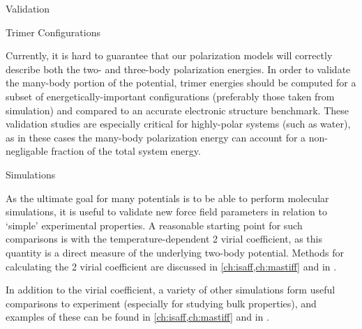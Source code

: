 \begin{subsection}{Validation}

\begin{paragraph}{Trimer Configurations}

Currently, it is hard to guarantee that our polarization models will
correctly describe both the two- and three-body polarization energies. In
order to validate the many-body portion of the potential, trimer
energies should be computed for a subset of energetically-important configurations
(preferably those taken from simulation) and compared to an accurate
electronic structure benchmark. These validation studies are especially
critical for highly-polar systems (such as water), as in these cases the
many-body polarization energy can account for a non-negligable fraction of the
total system energy.

\end{paragraph}

\begin{paragraph}{Simulations}

As the ultimate goal for many potentials is to be able to perform molecular
simulations, it is useful to validate new force field parameters in relation
to `simple' experimental properties. A reasonable starting point for such
comparisons is with the temperature-dependent 2 virial coefficient, as this quantity is a
direct measure of the underlying two-body potential. Methods for calculating
the 2 virial coefficient are discussed in \cref{ch:isaff,ch:mastiff}
and in .

In addition to the virial coefficient, a variety of other simulations form
useful comparisons to experiment (especially for studying bulk properties),
and examples of these can be found in 
\cref{ch:isaff,ch:mastiff} and in .

\end{paragraph}


\end{subsection}
